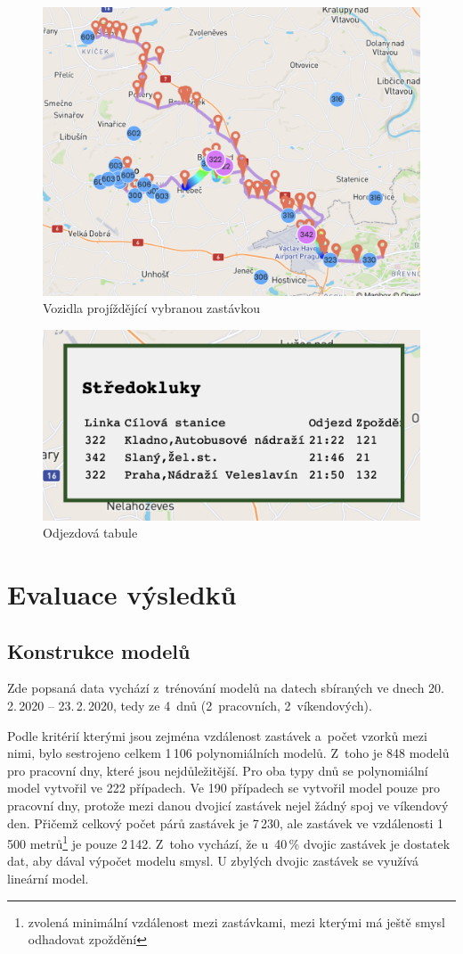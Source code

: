 \begin{figure}
   \centering
 \includegraphics[width=0.7\linewidth]{../img/more_trips.png}
 \caption{Vozidla projíždějící vybranou zastávkou}
 \label{fig:more_trips}
\end{figure}


\begin{figure}
   \centering
 \includegraphics[width=0.4\linewidth]{../img/stredokluky_table.png}
 \caption{Odjezdová tabule}
 \label{fig:stredokluky_table}
\end{figure}


\section{Evaluace výsledků}

\subsection{Konstrukce modelů}

Zde popsaná data vychází z~trénování modelů na datech sbíraných ve dnech 20.\,2.\,2020 -- 23.\,2.\,2020, tedy ze 4~dnů (2~pracovních, 2~víkendových).

\bigbreak

Podle kritérií kterými jsou zejména vzdálenost zastávek a~počet vzorků mezi nimi, bylo sestrojeno celkem 1\,106 polynomiálních modelů. Z~toho je 848 modelů pro pracovní dny, které jsou nejdůležitější. Pro oba typy dnů se polynomiální model vytvořil ve 222 případech. Ve 190 případech se vytvořil model pouze pro pracovní dny, protože mezi danou dvojicí zastávek nejel žádný spoj ve víkendový den. Přičemž celkový počet párů zastávek je 7\,230, ale zastávek ve vzdálenosti 1\,500 metrů\footnote{zvolená minimální vzdálenost mezi zastávkami, mezi kterými má ještě smysl odhadovat zpoždění} je pouze 2\,142. Z~toho vychází, že u~40\,\% dvojic zastávek je dostatek dat, aby dával výpočet modelu smysl. U zbylých dvojic zastávek se využívá lineární model.

